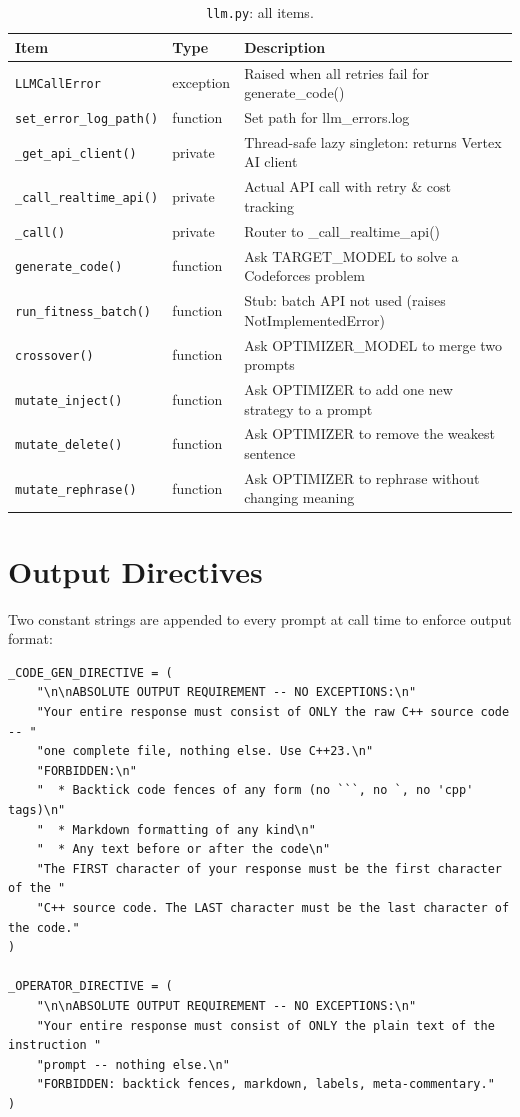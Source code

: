 \documentclass[11pt,a4paper]{report}
\newcommand{\pyfile}[1]{\texttt{#1}}
\newcommand{\fn}[1]{\texttt{#1}}
\begin{document}
\begin{table}[h]
\centering
\begin{tabular}{@{}llp{8.5cm}@{}}
\toprule
\textbf{Item} & \textbf{Type} & \textbf{Description} \\
\midrule
\fn{LLMCallError}          & exception & Raised when all retries fail for generate\_code() \\
\fn{set\_error\_log\_path()} & function & Set path for llm\_errors.log \\
\fn{\_get\_api\_client()}  & private  & Thread-safe lazy singleton: returns Vertex AI client \\
\fn{\_call\_realtime\_api()} & private & Actual API call with retry \& cost tracking \\
\fn{\_call()}              & private  & Router to \_call\_realtime\_api() \\
\fn{generate\_code()}      & function & Ask TARGET\_MODEL to solve a Codeforces problem \\
\fn{run\_fitness\_batch()}  & function & Stub: batch API not used (raises NotImplementedError) \\
\fn{crossover()}           & function & Ask OPTIMIZER\_MODEL to merge two prompts \\
\fn{mutate\_inject()}      & function & Ask OPTIMIZER to add one new strategy to a prompt \\
\fn{mutate\_delete()}      & function & Ask OPTIMIZER to remove the weakest sentence \\
\fn{mutate\_rephrase()}    & function & Ask OPTIMIZER to rephrase without changing meaning \\
\bottomrule
\end{tabular}
\caption{\pyfile{llm.py}: all items.}
\end{table}

\section{Output Directives}

Two constant strings are appended to every prompt at call time to enforce output format:

\begin{lstlisting}[style=example]
_CODE_GEN_DIRECTIVE = (
    "\n\nABSOLUTE OUTPUT REQUIREMENT -- NO EXCEPTIONS:\n"
    "Your entire response must consist of ONLY the raw C++ source code -- "
    "one complete file, nothing else. Use C++23.\n"
    "FORBIDDEN:\n"
    "  * Backtick code fences of any form (no ```, no `, no 'cpp' tags)\n"
    "  * Markdown formatting of any kind\n"
    "  * Any text before or after the code\n"
    "The FIRST character of your response must be the first character of the "
    "C++ source code. The LAST character must be the last character of the code."
)

_OPERATOR_DIRECTIVE = (
    "\n\nABSOLUTE OUTPUT REQUIREMENT -- NO EXCEPTIONS:\n"
    "Your entire response must consist of ONLY the plain text of the instruction "
    "prompt -- nothing else.\n"
    "FORBIDDEN: backtick fences, markdown, labels, meta-commentary."
)
\end{lstlisting}
\end{document}
